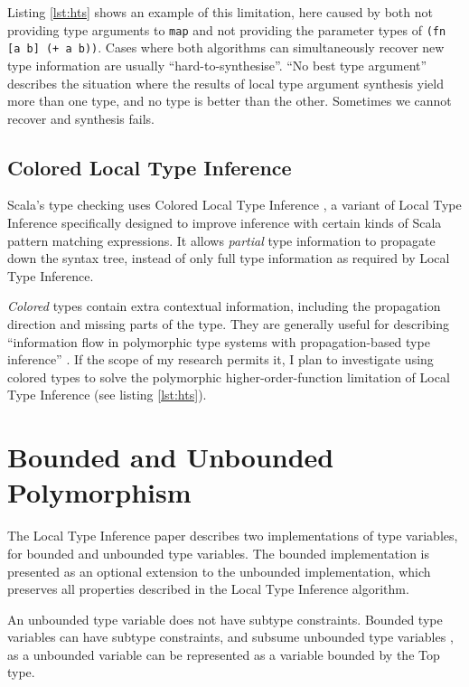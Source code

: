 Listing \ref{lst:hts} shows an example of this limitation,
here caused by both not providing type arguments to \lstinline|map| and not providing the parameter types of \lstinline|(fn [a b] (+ a b))|.
 Cases where both algorithms can simultaneously recover new type information are usually ``hard-to-synthesise''.
``No best type argument'' describes the situation where the results of local
type argument synthesis yield more than one type, and no type is better than the other. Sometimes we cannot recover and synthesis
fails.

\subsection{Colored Local Type Inference}

Scala's type checking uses Colored Local Type Inference \cite{OZZ01},
a variant of Local Type Inference \cite{PT00} specifically designed to
improve inference with certain kinds of Scala pattern matching expressions. It allows
\emph{partial} type information to propagate down the syntax tree, instead of only full type information
as required by Local Type Inference.

\emph{Colored} types contain extra contextual information, including the propagation direction
and missing parts of the type. They are generally useful
for describing ``information flow in polymorphic type systems with propagation-based type inference''
\cite{OZZ01}. If the scope of my research permits it, I plan to investigate
using colored types to solve the polymorphic higher-order-function limitation of Local Type Inference
(see listing \ref{lst:hts}).

\section{Bounded and Unbounded Polymorphism}

The Local Type Inference paper \cite{PT00}
describes two implementations of type variables, for bounded
and unbounded type variables. The bounded implementation is presented
as an optional extension  to the unbounded implementation, which preserves all
properties described in the Local Type Inference algorithm.

An unbounded type variable does not have subtype constraints.
Bounded type variables can have subtype constraints, and 
subsume unbounded type variables \cite{PT00}, 
as a unbounded variable can be represented as a variable bounded
by the Top type.

